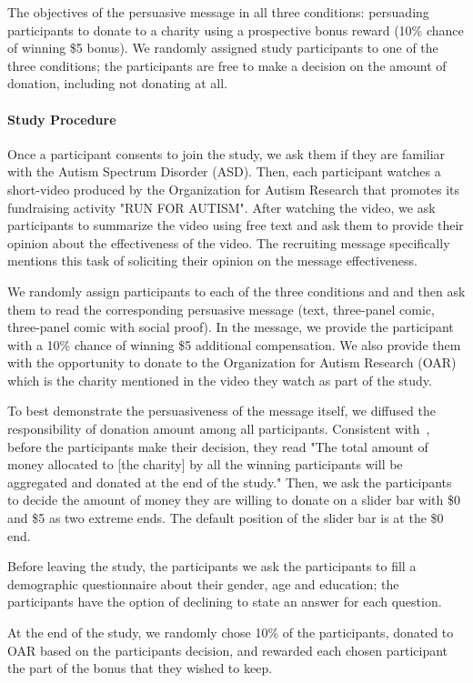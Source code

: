 The objectives of the persuasive message in all three conditions: persuading participants to donate to a charity using a prospective bonus reward (10\% chance of winning \$5 bonus). We randomly assigned study participants to one of the three conditions; the participants are free to make a decision on the amount of donation, including not donating at all.

\paragraph{Study Procedure} Once a participant consents to join the study, we ask them if they are  familiar with the Autism Spectrum Disorder (ASD). Then, each participant watches a short-video produced by the Organization for Autism Research that promotes its fundraising activity "RUN FOR AUTISM". After watching the video, we ask participants to summarize the video using free text and ask them to provide their opinion about the effectiveness of the video. The recruiting message specifically mentions this task of soliciting their opinion on the message effectiveness.

We randomly assign participants to each of the three conditions and and then ask them to read the corresponding persuasive message (text, three-panel comic, three-panel comic with social proof). In the message, we provide the participant with a 10\% chance of winning \$5 additional compensation. We also provide them with the opportunity to donate to the Organization for Autism Research (OAR) which is the charity mentioned in the video they watch as part of the study.

To best demonstrate the persuasiveness of the message itself, we diffused the responsibility of donation amount among all participants. Consistent with~\textcite{lee2013does}, before the participants make their decision, they read "The total amount of money allocated to [the charity] by all the winning participants will be aggregated and donated at the end of the study." Then, we ask the participants to decide the amount of money they are willing to donate on a slider bar with \$0 and \$5 as two extreme ends. The default position of the slider bar is at the \$0 end.

Before leaving the study, the participants we ask the participants to fill a demographic questionnaire about their gender, age and education; the participants have the option of declining to state an answer for each question.

At the end of the study, we randomly chose 10\% of the participants, donated to OAR based on the participants decision, and rewarded each chosen participant the part of the bonus that they wished to keep.

